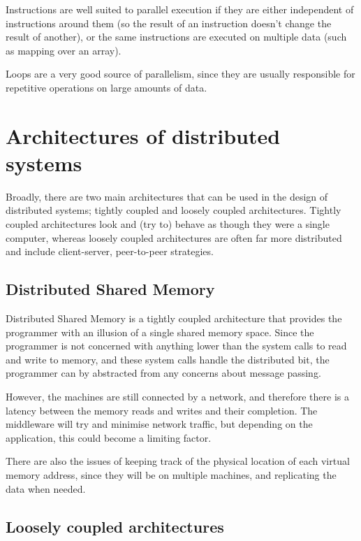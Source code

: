 Instructions are well suited to parallel execution if they are either
independent of instructions around them (so the result of an instruction doesn't
change the result of another), or the same instructions are executed on multiple
data (such as mapping over an array).

Loops are a very good source of parallelism, since they are usually responsible
for repetitive operations on large amounts of data.

\section{Architectures of distributed systems}

Broadly, there are two main architectures that can be used in the design of
distributed systems; tightly coupled and loosely coupled architectures. Tightly
coupled architectures look and (try to) behave as though they were a single
computer, whereas loosely coupled architectures are often far more distributed
and include client-server, peer-to-peer strategies.

\subsection{Distributed Shared Memory}

Distributed Shared Memory is a tightly coupled architecture that provides the
programmer with an illusion of a single shared memory space. Since the
programmer is not concerned with anything lower than the system calls to read
and write to memory, and these system calls handle the distributed bit, the
programmer can by abstracted from any concerns about message passing.

However, the machines are still connected by a network, and therefore there is a
latency between the memory reads and writes and their completion. The middleware
will try and minimise network traffic, but depending on the application, this
could become a limiting factor.

There are also the issues of keeping track of the physical location of each
virtual memory address, since they will be on multiple machines, and replicating
the data when needed.

\subsection{Loosely coupled architectures}


